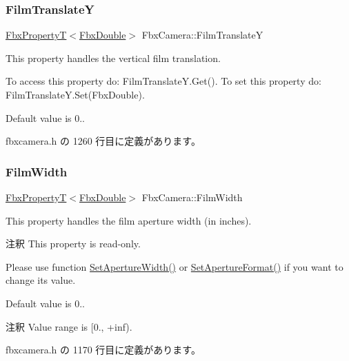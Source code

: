 \mbox{\label{class_fbx_camera_ab2fed4f94b108161a382cb53ecc9bc14}} 
\subsubsection{\texorpdfstring{Film\+TranslateY}{FilmTranslateY}}
{\footnotesize\ttfamily \hyperlink{class_fbx_property_t}{Fbx\+PropertyT}$<$\hyperlink{fbxtypes_8h_a171e72a1c46fc15c1a6c9c31948c1c5b}{Fbx\+Double}$>$ Fbx\+Camera\+::\+Film\+TranslateY}

This property handles the vertical film translation.

To access this property do\+: Film\+Translate\+Y.\+Get(). To set this property do\+: Film\+Translate\+Y.\+Set(\+Fbx\+Double).

Default value is 0.. 

 fbxcamera.\+h の 1260 行目に定義があります。

\mbox{\label{class_fbx_camera_a54f69a2e295c3c69df559f9b64699be5}} 
\subsubsection{\texorpdfstring{Film\+Width}{FilmWidth}}
{\footnotesize\ttfamily \hyperlink{class_fbx_property_t}{Fbx\+PropertyT}$<$\hyperlink{fbxtypes_8h_a171e72a1c46fc15c1a6c9c31948c1c5b}{Fbx\+Double}$>$ Fbx\+Camera\+::\+Film\+Width}

This property handles the film aperture width (in inches).

\begin{DoxyRemark}{注釈}
This property is read-\/only. 

Please use function \hyperlink{class_fbx_camera_ae927c1d64d3b28cce554d47ac56fdc92}{Set\+Aperture\+Width()} or \hyperlink{class_fbx_camera_a5b644b41e4d72c214acfdb5a2dee7576}{Set\+Aperture\+Format()} if you want to change its value.
\end{DoxyRemark}
Default value is 0.. \begin{DoxyRemark}{注釈}
Value range is \mbox{[}0., +inf). 
\end{DoxyRemark}


 fbxcamera.\+h の 1170 行目に定義があります。

